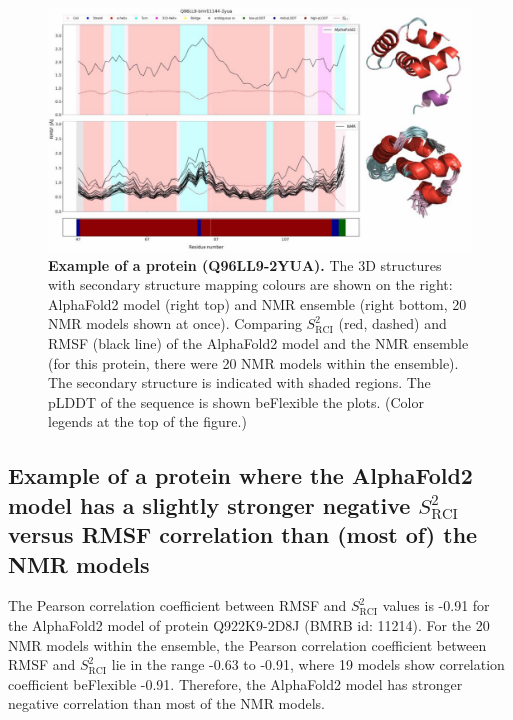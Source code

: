 \begin{figure}[H]
    \centering
    \includegraphics[width=\linewidth]{pLDDT//plddt_figures//supplementary_bhawna/supfig19.pdf}
    \caption{\textbf{Example of a protein (Q96LL9-2YUA).} The 3D structures with secondary structure mapping colours are shown on the right: AlphaFold2 model (right top) and NMR ensemble (right bottom, 20 NMR models shown at once). Comparing $S_{\text{RCI}}^{2}$ (red, dashed) and RMSF (black line) of the AlphaFold2 model and the NMR ensemble (for this protein, there were 20 NMR models within the ensemble). The secondary structure is indicated with shaded regions. The pLDDT of the sequence is shown beFlexible the plots. (Color legends at the top of the figure.)}
    \label{fig:plddt_sup:sup19}
\end{figure}

\subsection*{Example of a protein where the AlphaFold2 model has a slightly stronger negative $S_{\text{RCI}}^{2}$ versus RMSF correlation than (most of) the NMR models}

The Pearson correlation coefficient between RMSF and $S_{\text{RCI}}^{2}$ values is -0.91 for the AlphaFold2 model of protein Q922K9-2D8J (BMRB id: 11214). For the 20 NMR models within the ensemble, the Pearson correlation coefficient between RMSF and $S_{\text{RCI}}^{2}$ lie in the range -0.63 to -0.91, where 19 models show correlation coefficient beFlexible -0.91. Therefore, the AlphaFold2 model has stronger negative correlation than most of the NMR models.

